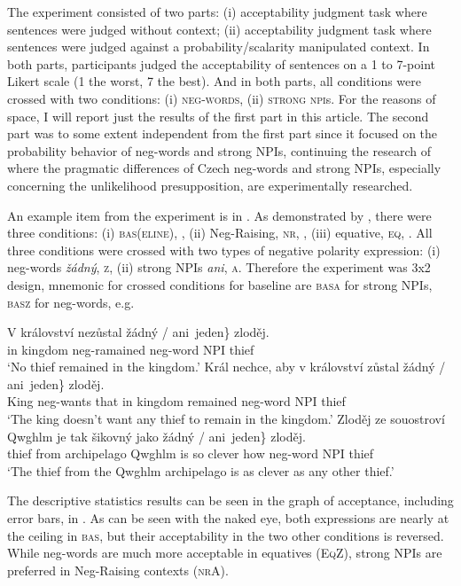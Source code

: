 The experiment consisted of two parts: (i) acceptability judgment task where sentences were judged without context; (ii) acceptability judgment task where sentences were judged against a probability/scalarity manipulated context. In both parts, participants judged the acceptability of sentences on a 1 to 7-point Likert scale (1 the worst, 7 the best). And in both parts, all conditions were crossed with two conditions: (i) \textsc{neg-words}, (ii) \textsc{strong npi}s. For the reasons of space, I will report just the results of the first part in this article. The second part was to some extent independent from the first part since it focused on the probability behavior of neg-words and strong NPIs, continuing the research of \citet{dovcekal2019pragmatic,dovcekal2020n} where the pragmatic differences of Czech neg-words and strong NPIs, especially concerning the unlikelihood presupposition, are experimentally researched.

An example item from the experiment is in . As demonstrated by , there were three conditions: (i) \textsc{bas(eline)}, , (ii) Neg-Raising, \textsc{nr}, , (iii) equative, \textsc{eq}, . All three conditions were crossed with two types of negative polarity expression: (i) neg-words \textit{žádný}, \textsc{z}, (ii) strong NPIs \textit{ani}, \textsc{a}. Therefore the experiment was 3x2 design, mnemonic for crossed conditions for baseline are \textsc{basa} for strong NPIs, \textsc{basz} for neg-words, e.g.

\ea\label{ex-8} \ea\label{ex-8-a} \gll V království nezůstal \minsp{\{} žádný / ani~jeden\} zloděj.\\
in kingdom neg-ramained {} neg-word {} NPI thief\\
\glt `No thief remained in the kingdom.' 
\ex\label{ex-8-b} \gll Král nechce, aby v království zůstal \minsp{\{} žádný / ani~jeden\} zloděj.\\
King neg-wants that in kingdom remained {} neg-word {} NPI thief\\
\glt `The king doesn't want any thief to remain in the kingdom.' 
\ex\label{ex-8-c} \gll Zloděj ze souostroví Qwghlm je tak šikovný jako \minsp{\{} žádný / ani~jeden\} zloděj.\\
thief from archipelago Qwghlm is so clever how {} neg-word {} NPI thief\\
\glt `The thief from the Qwghlm archipelago is as clever as any other thief.'
\z\z
  
The descriptive statistics results can be seen in the graph of acceptance, including error bars, in . As can be seen with the naked eye, both expressions are nearly at the ceiling in \textsc{bas}, but their acceptability in the two other conditions is reversed. While neg-words are much more acceptable in equatives (\textsc{EqZ}), strong NPIs are preferred in Neg-Raising contexts (\textsc{nrA}).

